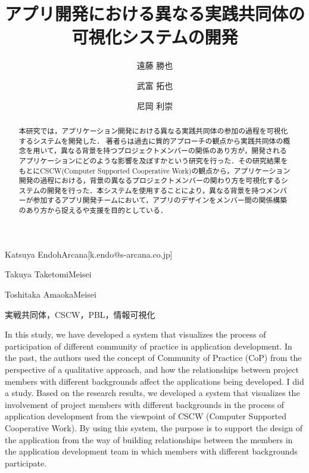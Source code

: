 \documentclass[submit,techrep]{ipsj}
\begin{document}
\title{アプリ開発における異なる実践共同体の\\
可視化システムの開発}




\author{遠藤 勝也}{Katsuya Endoh}{Arcana}[k.endo@s-arcana.co.jp]
\author{武富 拓也}{Takuya Taketomi}{Meisei}
\author{尼岡 利崇}{Toshitaka Amaoka}{Meisei}

\begin{abstract}
本研究では，アプリケーション開発における異なる実践共同体の参加の過程を可視化するシステムを開発した．
著者らは過去に質的アプローチの観点から実践共同体の概念を用いて，異なる背景を持つプロジェクトメンバーの関係のあり方が，開発されるアプリケーションにどのような影響を及ぼすかという研究を行った．その研究結果をもとにCSCW(Computer Supported Cooperative Work)の観点から，アプリケーション開発の過程における，背景の異なるプロジェクトメンバーの関わり方を可視化するシステムの開発を行った．本システムを使用することにより，異なる背景を持つメンバーが参加するアプリ開発チームにおいて，アプリのデザインをメンバー間の関係構築のあり方から捉えるや支援を目的としている．
\end{abstract}


\begin{jkeyword}
実戦共同体，CSCW，PBL，情報可視化
\end{jkeyword}

\begin{eabstract}
In this study, we have developed a system that visualizes the process of participation of different community of practice in application development.
In the past, the authors used the concept of Community of Practice (CoP) from the perspective of a qualitative approach, and how the relationships between project members with different backgrounds affect the applications being developed. I did a study. Based on the research results, we developed a system that visualizes the involvement of project members with different backgrounds in the process of application development from the viewpoint of CSCW (Computer Supported Cooperative Work). By using this system, the purpose is to support the design of the application from the way of building relationships between the members in the application development team in which members with different backgrounds participate.
\end{eabstract}
\end{document}
